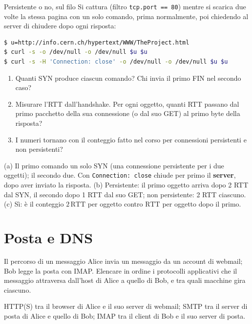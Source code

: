 \begin{esercizio}{Persistente o no, sul filo}
Si cattura (filtro \texttt{tcp.port == 80}) mentre si scarica due volte la stessa pagina con un solo comando, prima normalmente, poi
chiedendo al server di chiudere dopo ogni risposta:
\begin{lstlisting}[language=bash]
$ u=http://info.cern.ch/hypertext/WWW/TheProject.html
$ curl -s -o /dev/null -o /dev/null $u $u
$ curl -s -H 'Connection: close' -o /dev/null -o /dev/null $u $u
\end{lstlisting}
\begin{enumerate}[label=(\alph*)]
    \item Quanti SYN produce ciascun comando? Chi invia il primo FIN nel secondo caso?
    \item Misurare l'RTT dall'handshake. Per ogni oggetto, quanti RTT passano dal primo pacchetto della sua connessione (o dal suo GET) al
          primo byte della risposta?
    \item I numeri tornano con il conteggio fatto nel corso per connessioni persistenti e non persistenti?
\end{enumerate}

\svolgimento
(a) Il primo comando un solo SYN (una connessione persistente per i due oggetti); il secondo due. Con \texttt{Connection: close} chiude
per primo il \textbf{server}, dopo aver inviato la risposta. (b) Persistente: il primo oggetto arriva dopo 2 RTT dal SYN, il secondo
dopo 1 RTT dal suo GET; non persistente: 2 RTT ciascuno. (c) Sì: è il conteggio $2\,\text{RTT}$ per oggetto contro $\text{RTT}$ per
oggetto dopo il primo.
\end{esercizio}

\section{Posta e DNS}

\begin{esercizio}{Il percorso di un messaggio}
Alice invia un messaggio da un account di webmail; Bob legge la posta con IMAP. Elencare in ordine i protocolli applicativi che il
messaggio attraversa dall'host di Alice a quello di Bob, e tra quali macchine gira ciascuno.

\svolgimento
HTTP(S) tra il browser di Alice e il suo server di webmail; SMTP tra il server di posta di Alice e quello di Bob; IMAP tra il client di
Bob e il suo server di posta.
\end{esercizio}

